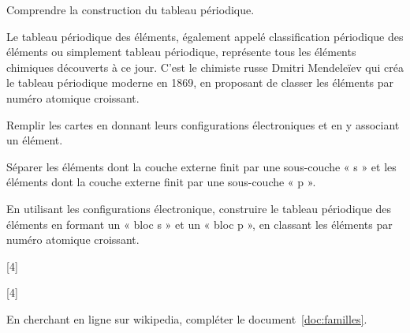 \teteSndAtom


\vspace*{-12pt}
\begin{objectifs}
  \item Comprendre la construction du tableau périodique.
\end{objectifs}

\begin{contexte}
  Le tableau périodique des éléments, également appelé classification périodique des éléments ou simplement tableau périodique, représente tous les éléments chimiques découverts à ce jour. C'est le chimiste russe Dmitri Mendeleïev qui créa le tableau périodique moderne en 1869, en proposant de classer les éléments par numéro atomique croissant.

\end{contexte}


\mesure
Remplir les cartes en donnant leurs configurations électroniques et en y associant un élément.

\mesure
Séparer les éléments dont la couche externe finit par une sous-couche « s » et les éléments dont la couche externe finit par une sous-couche « p ».

\mesure
En utilisant les configurations électronique, construire le tableau périodique des éléments en formant un « bloc s » et un « bloc p », en classant les éléments par numéro atomique croissant.


[4]

[4]

\mesure En cherchant en ligne sur wikipedia, compléter le document~\ref{doc:familles}.

